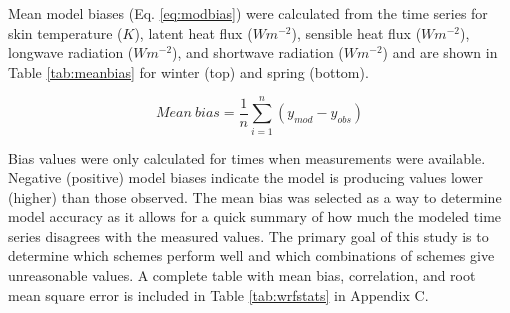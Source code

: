  Mean model biases (Eq. \ref{eq:modbias}) were calculated from the time series for skin temperature ($K$), latent heat flux ($Wm^{-2}$), sensible heat flux ($Wm^{-2}$), longwave radiation ($Wm^{-2}$), and shortwave radiation ($Wm^{-2}$) and are shown in Table \ref{tab:meanbias} for winter (top) and spring (bottom). 
 
\begin{equation}\label{eq:modbias}
Mean~bias = \frac{1}{n}\sum^{n}_{i=1}(y_{mod} - y_{obs})
\end{equation}

 Bias values were only calculated for times when measurements were available. Negative (positive) model biases indicate the model is producing values lower (higher) than those observed.  The mean bias was selected as a way to determine model accuracy as it allows for a quick summary of how much the modeled time series disagrees with the measured values. The primary goal of this study is to determine which schemes perform well and which combinations of schemes give unreasonable values. A complete table with mean bias, correlation, and root mean square error is included in Table \ref{tab:wrfstats} in Appendix C. 

